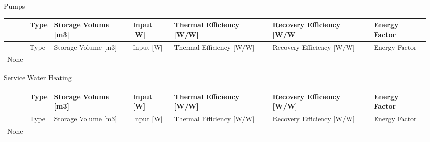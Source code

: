 Pumps

\begin{longtable}[c]{p{0.85in}p{0.85in}p{0.85in}p{0.85in}p{0.85in}p{0.85in}p{0.85in}}
\toprule 
~ & Type & Storage Volume [m3] & Input [W] & Thermal Efficiency [W/W] & Recovery Efficiency [W/W] & Energy Factor \tabularnewline
\midrule
\endfirsthead

\toprule 
~ & Type & Storage Volume [m3] & Input [W] & Thermal Efficiency [W/W] & Recovery Efficiency [W/W] & Energy Factor \tabularnewline
\midrule
\endhead

None & ~ & ~ & ~ & ~ & ~ & ~ \tabularnewline
\bottomrule
\end{longtable}

Service Water Heating

\begin{longtable}[c]{p{0.85in}p{0.85in}p{0.85in}p{0.85in}p{0.85in}p{0.85in}p{0.85in}}
\toprule 
~ & Type & Storage Volume [m3] & Input [W] & Thermal Efficiency [W/W] & Recovery Efficiency [W/W] & Energy Factor \tabularnewline
\midrule
\endfirsthead

\toprule 
~ & Type & Storage Volume [m3] & Input [W] & Thermal Efficiency [W/W] & Recovery Efficiency [W/W] & Energy Factor \tabularnewline
\midrule
\endhead

None & ~ & ~ & ~ & ~ & ~ & ~ \tabularnewline
\bottomrule
\end{longtable}
